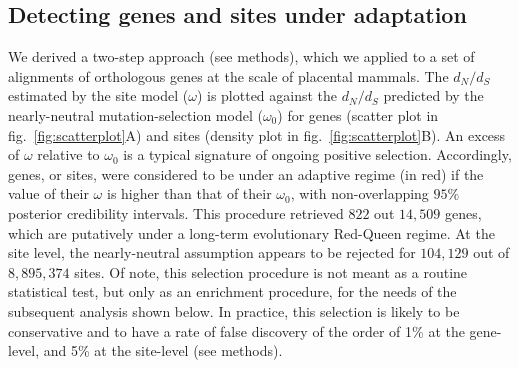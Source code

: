 \documentclass{article}
\newcommand{\dn}{d_N}
\newcommand{\ds}{d_S}
\newcommand{\dnds}{\dn / \ds}
\begin{document}
    \subsection*{Detecting genes and sites under adaptation}
    We derived a two-step approach (see methods), which we applied to a set of alignments of orthologous genes at the scale of placental mammals.
    The $\dnds$ estimated by the site model ($\omega$) is plotted against the $\dnds$ predicted by the nearly-neutral mutation-selection model ($\omega_{0}$) for genes (scatter plot in fig.~\ref{fig:scatterplot}A) and sites (density plot in fig.~\ref{fig:scatterplot}B).
    An excess of $\omega$ relative to $\omega_{0}$ is a typical signature of ongoing positive selection\cite{bloom_identification_2017, rodrigue_detecting_2017}.
    Accordingly, genes, or sites, were considered to be under an adaptive regime (in red) if the value of their $\omega$ is higher than that of their $\omega_{0}$, with non-overlapping $95\%$ posterior credibility intervals.
    This procedure retrieved $822$ out $14,509$ genes, which are putatively under a long-term evolutionary Red-Queen regime.
    At the site level, the nearly-neutral assumption appears to be rejected for $104,129$ out of $8,895,374$ sites.
    Of note, this selection procedure is not meant as a routine statistical test, but only as an enrichment procedure, for the needs of the subsequent analysis shown below.
    In practice, this selection is likely to be conservative and to have a rate of false discovery of the order of 1\% at the gene-level, and 5\% at the site-level (see methods).
\end{document}
